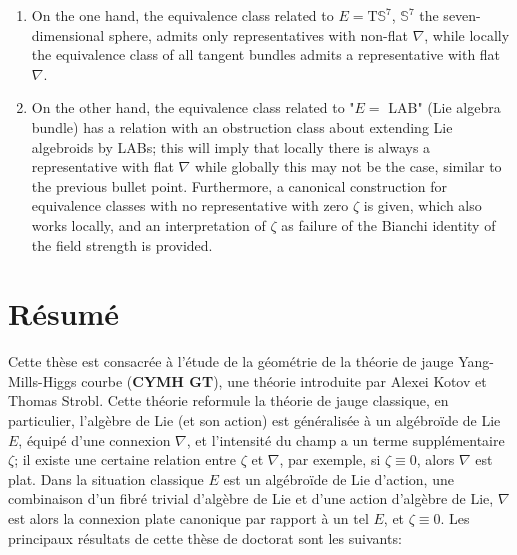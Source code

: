 \documentclass[a4paper,twoside,11pt]{scrbook}
\theoremstyle{plain}
\theoremstyle{remark}
\theoremstyle{definition}
\begin{document}
\begin{itemize}
	\begin{enumerate}
	\item On the one hand, the equivalence class related to $E = \mathrm{T}\mathds{S}^7$, $\mathds{S}^7$ the seven-dimensional sphere, admits only representatives with non-flat $\nabla$, while locally the equivalence class of all tangent bundles admits a representative with flat $\nabla$.
	\item On the other hand, the equivalence class related to "$E=$ LAB" (Lie algebra bundle) has a relation with an obstruction class about extending Lie algebroids by LABs; this will imply that locally there is always a representative with flat $\nabla$ while globally this may not be the case, similar to the previous bullet point. Furthermore, a canonical construction for equivalence classes with no representative with zero $\zeta$ is given, which also works locally, and an interpretation of $\zeta$ as failure of the Bianchi identity of the field strength is provided. 
	\end{enumerate}
\end{itemize}

\newpage

\chapter*{Résumé}
Cette thèse est consacrée à l'étude de la géométrie de la théorie de jauge Yang-Mills-Higgs courbe (\textbf{CYMH GT}), une théorie introduite par Alexei Kotov et Thomas Strobl. Cette théorie reformule la théorie de jauge classique, en particulier, l'algèbre de Lie (et son action) est généralisée à un algébroïde de Lie $E$, équipé d'une connexion $\nabla$, et l'intensité du champ a un terme supplémentaire $\zeta$; il existe une certaine relation entre $\zeta$ et $\nabla$, par exemple, si $\zeta \equiv 0$, alors $\nabla$ est plat. Dans la situation classique $E$ est un algébroïde de Lie d'action, une combinaison d'un fibré trivial d'algèbre de Lie et d'une action d'algèbre de Lie, $\nabla$ est alors la connexion plate canonique par rapport à un tel $E$, et $\zeta\equiv 0$. Les principaux résultats de cette thèse de doctorat sont les suivants:
\end{document}
